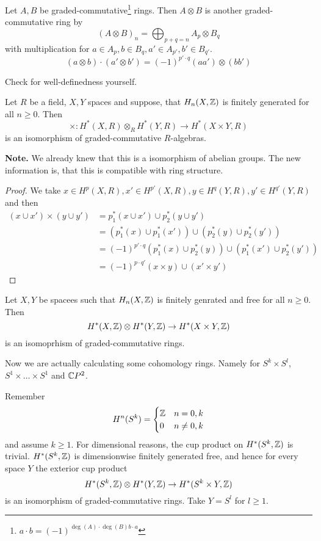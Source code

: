\documentclass[language=english]{TemplateLecture}
\begin{document}
\begin{construction}
    Let \(A,B\) be graded-commutative\footnote{\(a \cdot b = (-1)^{\deg(A) \cdot\deg(B) b\cdot a}\)} rings. Then \(A\otimes B\) is another graded-commutative ring by
    \[(A\otimes B)_n = \bigoplus_{p+q = n} A_p \otimes B_q\]
    with multiplication for \(a \in A_p, b \in B_q, a' \in A_{p'}, b' \in B_{q'}\).
    \[(a\otimes b) \cdot (a' \otimes b') = (-1)^{p' \cdot q} (aa') \otimes (bb')\]

    Check for well-definedness yourself.
\end{construction}

\begin{corollary}
    Let \(R\) be a field, \(X,Y\) spaces and suppose, that \(H_n(X, \mathbb{Z})\) is finitely generated for all \(n \geq 0\). Then
    \[\times\colon H^*(X,R) \otimes_R H^*(Y,R) \to H^*(X\times Y, R)\]
    is an isomorphism of graded-commutative \(R\)-algebras.
\end{corollary}

\textbf{Note.} We already knew that this is a isomorphism of abelian groups. The new information is, that this is compatible with ring structure.

\begin{proof}
    We take \(x \in H^p(X,R), x' \in H^{p'}(X,R) , y \in H^q(Y,R) , y' \in H^{q'}(Y,R)\) and then
    \[\begin{split}
        (x \cup x') \times (y \cup y') &= p_1^*(x \cup x') \cup p_2^*(y \cup y')\\
        &= (p_1^*(x) \cup p_1^*(x')) \cup (p_2^*(y) \cup p_2^*(y')) \\
        &= (-1)^{p'\cdot q} (p_1^*(x) \cup p_2^*(y)) \cup (p_1^*(x') \cup p_2^*(y')) \\
        &=(-1)^{p\cdot q'} (x \times y) \cup (x' \times y')
    \end{split}\]
\end{proof}

\begin{corollary}
    Let \(X,Y\) be spacees such that \(H_n(X, \mathbb{Z})\) is finitely genrated and free for all \(n \geq 0\). Then
    \[H^*(X, \mathbb{Z}) \otimes H^*(Y,\mathbb{Z}) \to H^*(X\times Y, \mathbb{Z})\]
    is an isomoprhism of graded-commutative rings.
\end{corollary}

Now we are actually calculating some cohomology rings. Namely for \(S^k \times S^l\), \(S^1 \times \dots \times S^1\) and \(\mathbb{C} P^2\).

Remember
\[H^n(S^k) = \begin{cases}
    \mathbb{Z} & n = 0,k \\
    0 & n \neq 0,k \\
\end{cases}\]
and assume \(k \geq 1\). For dimensional reasons, the cup product on \(H^*(S^k, \mathbb{Z})\) is trivial. \(H^*(S^k, \mathbb{Z})\) is dimensionwise finitely generated free, and hence for every space \(Y\) the exterior cup product
\[H^*(S^k, \mathbb{Z}) \otimes H^*(Y, \mathbb{Z}) \to H^*(S^k \times Y, \mathbb{Z})\]
is an isomorphism of graded-commutative rings. Take \(Y = S^l\) for \(l \geq 1\).
\end{document}
